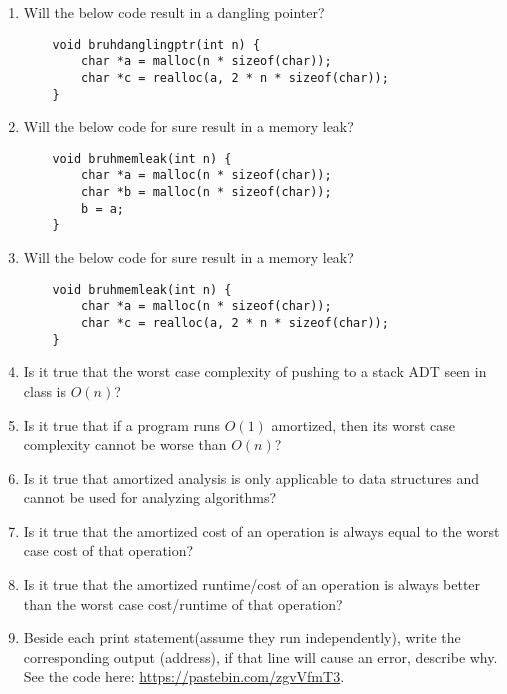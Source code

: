 \documentclass{article}
\begin{document}
\begin{enumerate}
    \item Will the below code result in a dangling pointer?
    \begin{lstlisting}
    void bruhdanglingptr(int n) {
        char *a = malloc(n * sizeof(char));
        char *c = realloc(a, 2 * n * sizeof(char));
    }
    \end{lstlisting}
    
    \item Will the below code for sure result in a memory leak?
    \begin{lstlisting}
    void bruhmemleak(int n) {
        char *a = malloc(n * sizeof(char));
        char *b = malloc(n * sizeof(char));
        b = a;
    }
    \end{lstlisting}
    
    \item Will the below code for sure result in a memory leak?
    \begin{lstlisting}
    void bruhmemleak(int n) {
        char *a = malloc(n * sizeof(char));
        char *c = realloc(a, 2 * n * sizeof(char));
    }
    \end{lstlisting}

    \item Is it true that the worst case complexity of pushing to a stack ADT seen in class is \( O(n) \)?
    
    \item Is it true that if a program runs \( O(1) \) amortized, then its worst case complexity cannot be worse than \( O(n) \)?
    
    \item Is it true that amortized analysis is only applicable to data structures and cannot be used for analyzing algorithms?
    
    \item Is it true that the amortized cost of an operation is always equal to the worst case cost of that operation?
    
    \item Is it true that the amortized runtime/cost of an operation is always better than the worst case cost/runtime of that operation?
    
    \item Beside each print statement(assume they run independently), write the corresponding output (address), if that line will cause an error, describe why. See the code here: \url{https://pastebin.com/zgvVfmT3}.
    \vspace{10pt}

    
\end{enumerate}
\end{document}
